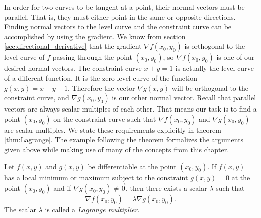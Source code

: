 In order for two curves to be tangent at a point, their normal vectors must be parallel. That is, they must either point in the same or opposite directions. Finding normal vectors to the level curve and the constraint curve can be accomplished by using the gradient. We know from section \ref{sec:directional_derivative} that the gradient $\nabla f(x_0,y_0)$ is orthogonal to the level curve of $f$ passing through the point $(x_0,y_0)$, so $\nabla f(x_0,y_0)$ is one of our desired normal vectors.  The constraint curve $x+y=1$ is actually the level curve of a different function. It is the zero level curve of the function $g(x,y)=x+y-1$. Therefore the vector $\nabla g(x,y)$ will be orthogonal to the constraint curve, and $\nabla g(x_0,y_0)$ is our other normal vector.  Recall that parallel vectors are always scalar multiples of each other. That means our task is to find a point $(x_0,y_0)$ on the constraint curve such that $\nabla f(x_0,y_0)$ and $\nabla g(x_0,y_0)$ are scalar multiples.  We state these requirements explicitly in theorem \ref{thm:Lagrange}.  The example following the theorem formalizes the arguments given above while making use of many of the concepts from this chapter.


{Let $f(x,y)$ and $g(x,y)$ be differentiable at the point $(x_0,y_0)$.  If $f(x,y)$ has a local minimum or maximum subject to the constraint $g(x,y)=0$ at the point $(x_0,y_0)$ and if $\nabla g(x_0,y_0) \neq \vec{0}$, then there exists a scalar $\lambda$ such that
	\[
		\nabla f(x_0,y_0) = \lambda \nabla g(x_0,y_0).
	\]
The scalar $\lambda$ is called a \emph{Lagrange multiplier}. 
}

